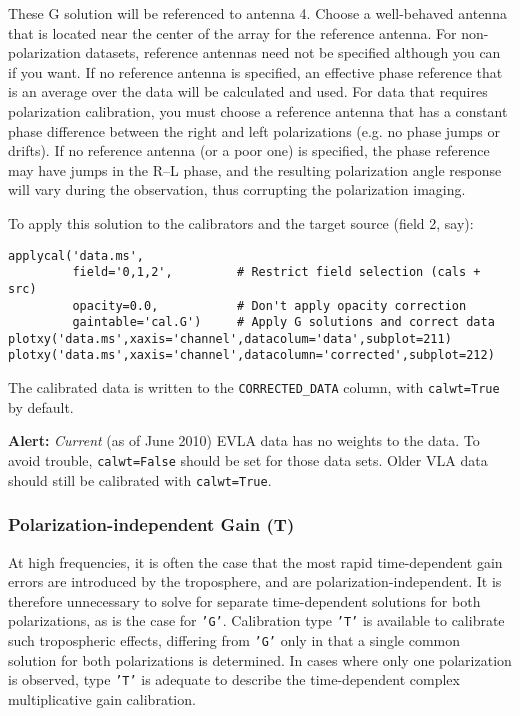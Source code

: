 These G solution will be referenced to antenna 4.  Choose a
well-behaved antenna that is located near the center of the array for
the reference antenna.  For non-polarization datasets, reference
antennas need not be specified although you can if you want.  If no
reference antenna is specified, an effective phase reference that is
an average over the data will be calculated and used.  For data that
requires polarization calibration, you must choose a reference antenna
that has a constant phase difference between the right and left
polarizations (e.g. no phase jumps or drifts).  If no reference
antenna (or a poor one) is specified, the phase reference may have
jumps in the R--L phase, and the resulting polarization angle response
will vary during the observation, thus corrupting the polarization
imaging.

To apply this solution to the calibrators and the target source (field
2, say):
\small
\begin{verbatim}
applycal('data.ms',
         field='0,1,2',         # Restrict field selection (cals + src)
         opacity=0.0,           # Don't apply opacity correction
         gaintable='cal.G')     # Apply G solutions and correct data
plotxy('data.ms',xaxis='channel',datacolum='data',subplot=211)
plotxy('data.ms',xaxis='channel',datacolumn='corrected',subplot=212)
\end{verbatim}
\normalsize
The calibrated data is written to the {\tt CORRECTED\_DATA} column, with 
{\tt calwt=True} by default.

{\bf Alert:} {\it Current} (as of June 2010)  EVLA data has no weights
to the data. To avoid trouble, {\tt calwt=False} should be set for
those data sets. Older VLA data should still be calibrated with  {\tt calwt=True}.

\subsubsection{Polarization-independent Gain (T)}
\label{section:cal.solve.gain.t}

At high frequencies, it is often the case that the most rapid
time-dependent gain errors are introduced by the troposphere, and are
polarization-independent.  It is therefore unnecessary to solve for
separate time-dependent solutions for both polarizations, as is the
case for {\tt 'G'}.  Calibration type {\tt 'T'} is available to calibrate such
tropospheric effects, differing from {\tt 'G'} only in that a single common
solution for both polarizations is determined.  In cases where only
one polarization is observed, type {\tt 'T'} is adequate to describe the
time-dependent complex multiplicative gain calibration.

